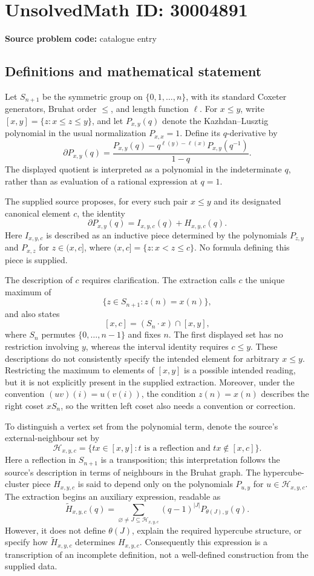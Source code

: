 \documentclass[11pt]{article}
\begin{document}
\section*{UnsolvedMath ID: 30004891}
\textbf{Source problem code:} catalogue entry
\subsection{Definitions and mathematical statement}
Let \(S_{n+1}\) be the symmetric group on \(\{0,1,\ldots,n\}\), with its standard Coxeter generators, Bruhat order \(\leq\), and length function \(\ell\). For \(x\leq y\), write \([x,y]=\{z:x\leq z\leq y\}\), and let \(P_{x,y}(q)\) denote the Kazhdan--Lusztig polynomial in the usual normalization \(P_{x,x}=1\). Define its \(q\)-derivative by
\[
\partial P_{x,y}(q)=\frac{P_{x,y}(q)-q^{\ell(y)-\ell(x)}P_{x,y}(q^{-1})}{1-q}.
\]
The displayed quotient is interpreted as a polynomial in the indeterminate \(q\), rather than as evaluation of a rational expression at \(q=1\).

The supplied source proposes, for every such pair \(x\leq y\) and its designated canonical element \(c\), the identity
\[
\partial P_{x,y}(q)=I_{x,y,c}(q)+H_{x,y,c}(q).
\]
Here \(I_{x,y,c}\) is described as an inductive piece determined by the polynomials \(P_{z,y}\) and \(P_{x,z}\) for \(z\in(x,c]\), where \((x,c]=\{z:x<z\leq c\}\). No formula defining this piece is supplied.

The description of \(c\) requires clarification. The extraction calls \(c\) the unique maximum of
\[
\{z\in S_{n+1}:z(n)=x(n)\},
\]
and also states
\[
[x,c]=(S_n\cdot x)\cap[x,y],
\]
where \(S_n\) permutes \(\{0,\ldots,n-1\}\) and fixes \(n\). The first displayed set has no restriction involving \(y\), whereas the interval identity requires \(c\leq y\). These descriptions do not consistently specify the intended element for arbitrary \(x\leq y\). Restricting the maximum to elements of \([x,y]\) is a possible intended reading, but it is not explicitly present in the supplied extraction. Moreover, under the convention \((uv)(i)=u(v(i))\), the condition \(z(n)=x(n)\) describes the right coset \(xS_n\), so the written left coset also needs a convention or correction.

To distinguish a vertex set from the polynomial term, denote the source's external-neighbour set by
\[
\mathcal H_{x,y,c}=\{tx\in[x,y]:t\text{ is a reflection and }tx\notin[x,c]\}.
\]
Here a reflection in \(S_{n+1}\) is a transposition; this interpretation follows the source's description in terms of neighbours in the Bruhat graph. The hypercube-cluster piece \(H_{x,y,c}\) is said to depend only on the polynomials \(P_{u,y}\) for \(u\in\mathcal H_{x,y,c}\). The extraction begins an auxiliary expression, readable as
\[
\widetilde H_{x,y,c}(q)=\sum_{\varnothing\ne J\subseteq\mathcal H_{x,y,c}}(q-1)^{|J|}P_{\theta(J),y}(q).
\]
However, it does not define \(\theta(J)\), explain the required hypercube structure, or specify how \(\widetilde H_{x,y,c}\) determines \(H_{x,y,c}\). Consequently this expression is a transcription of an incomplete definition, not a well-defined construction from the supplied data.
\end{document}
